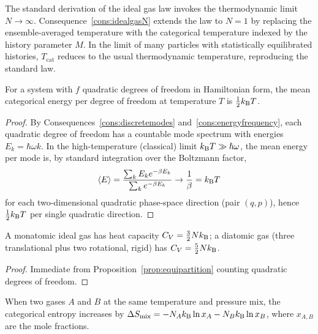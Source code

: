 \begin{remark}
The standard derivation of the ideal gas law invokes the thermodynamic limit $N\to\infty$. Consequence~\ref{cons:idealgasN} extends the law to $N=1$ by replacing the ensemble-averaged temperature with the categorical temperature indexed by the history parameter $M$. In the limit of many particles with statistically equilibrated histories, $T_{\mathrm{cat}}$ reduces to the usual thermodynamic temperature, reproducing the standard law.
\end{remark}

\begin{proposition}[Equipartition]
\label{prop:equipartition}
For a system with $f$ quadratic degrees of freedom in Hamiltonian form, the mean categorical energy per degree of freedom at temperature $T$ is $\tfrac{1}{2}k_{\mathrm{B}} T$.
\end{proposition}

\begin{proof}
By Consequences~\ref{cons:discretemodes} and~\ref{cons:energyfrequency}, each quadratic degree of freedom has a countable mode spectrum with energies $E_{k}=\hbar\omega k$. In the high-temperature (classical) limit $k_{\mathrm{B}} T\gg\hslash\omega$, the mean energy per mode is, by standard integration over the Boltzmann factor,
\begin{equation*}
\langle E\rangle=\frac{\sum_{k}E_{k}e^{-\beta E_{k}}}{\sum_{k}e^{-\beta E_{k}}}\to\frac{1}{\beta}=k_{\mathrm{B}} T
\end{equation*}
for each two-dimensional quadratic phase-space direction (pair $(q,p)$), hence $\tfrac{1}{2}k_{\mathrm{B}} T$ per single quadratic direction.
\end{proof}

\begin{corollary}
\label{cor:heatcap}
A monatomic ideal gas has heat capacity $C_{V}=\tfrac{3}{2}Nk_{\mathrm{B}}$; a diatomic gas (three translational plus two rotational, rigid) has $C_{V}=\tfrac{5}{2}Nk_{\mathrm{B}}$.
\end{corollary}

\begin{proof}
Immediate from Proposition~\ref{prop:equipartition} counting quadratic degrees of freedom.
\end{proof}

\begin{proposition}
\label{prop:entmix}
When two gases $A$ and $B$ at the same temperature and pressure mix, the categorical entropy increases by $\Delta S_{\mathrm{mix}}=-N_{A}k_{\mathrm{B}}\ln x_{A}-N_{B}k_{\mathrm{B}}\ln x_{B}$, where $x_{A,B}$ are the mole fractions.
\end{proposition}

